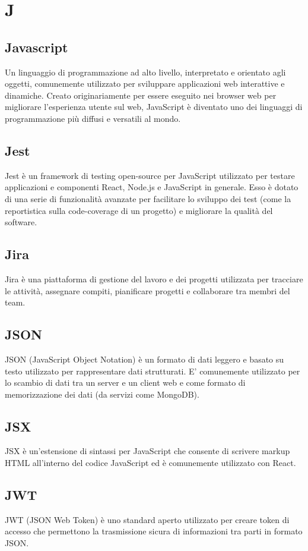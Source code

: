 \section*{J} 
\subsection*{Javascript} 
Un linguaggio di programmazione ad alto livello, interpretato e orientato agli oggetti, comunemente utilizzato per sviluppare applicazioni web interattive e dinamiche. Creato originariamente per essere eseguito nei browser web per migliorare l'esperienza utente sul web, JavaScript è diventato uno dei linguaggi di programmazione più diffusi e versatili al mondo.
\subsection*{Jest} 
Jest è un framework di testing open-source per JavaScript utilizzato per testare applicazioni e componenti React, Node.js e JavaScript in generale. Esso è dotato di una serie di funzionalità avanzate per facilitare lo sviluppo dei test (come la reportistica sulla code-coverage di un progetto) e migliorare la qualità del software.
\subsection*{Jira} 
Jira è una piattaforma di gestione del lavoro e dei progetti utilizzata per tracciare le attività, assegnare compiti, pianificare progetti e collaborare tra membri del team.
\subsection*{JSON} 
JSON (JavaScript Object Notation) è un formato di dati leggero e basato su testo utilizzato per rappresentare dati strutturati. E' comunemente utilizzato per lo scambio di dati tra un server e un client web e come formato di memorizzazione dei dati (da servizi come MongoDB).
\subsection*{JSX} 
JSX è un'estensione di sintassi per JavaScript che consente di scrivere markup HTML all'interno del codice JavaScript ed è comunemente utilizzato con React.
\subsection*{JWT} 
JWT (JSON Web Token) è uno standard aperto utilizzato per creare token di accesso che permettono la trasmissione sicura di informazioni tra parti in formato JSON.
